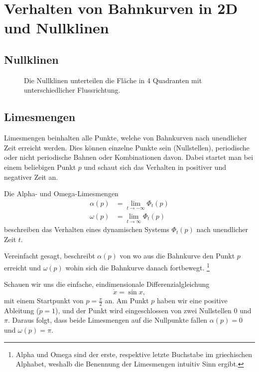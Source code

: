 \section{Verhalten von Bahnkurven in 2D und Nullklinen} \label{poinbendix:section:nullklinen}

\subsection{Nullklinen} \label{poinbendix:subsection:nullklinen}


\begin{figure}
    \centering
    
    \caption{Die Nullklinen unterteilen die Fläche in 4 Quadranten mit unterschiedlicher Flussrichtung.}
    \label{poinbendix:fig:nullklinen}
\end{figure}

\subsection{Limesmengen} \label{poinbendix:subsection:limesmengen}

Limesmengen beinhalten alle Punkte, welche von Bahnkurven nach unendlicher Zeit erreicht werden.
Dies können einzelne Punkte sein (Nullstellen), periodische oder nicht periodische Bahnen oder Kombinationen davon.
Dabei startet man bei einem beliebigen Punkt $p$ und schaut sich das Verhalten in positiver und negativer Zeit an.

\begin{definition}[Limesmengen]
Die Alpha- und Omega-Limesmengen
\label{poinbendix:def:limesmengen}
\begin{align*}
    \alpha(p) &= \lim_{t\to-\infty} \Phi_t(p) \\
    \omega(p) &= \lim_{t\to\infty} \Phi_t(p)
\end{align*}
beschreiben das Verhalten eines dynamischen Systems $\Phi_t(p)$ nach unendlicher Zeit $t$.
\end{definition}

Vereinfacht gesagt, beschreibt $\alpha(p)$ von wo aus die Bahnkurve den Punkt $p$ erreicht und $\omega(p)$ wohin sich die Bahnkurve danach fortbewegt.
\footnote{Alpha und Omega sind der erste, respektive letzte Buchstabe im griechischen Alphabet, weshalb die Benennung der Limesmengen intuitiv Sinn ergibt.}

\begin{beispiel} \label{poinbendix:beispiel:1dlimesmengen}
Schauen wir uns die einfache, eindimensionale Differenzialgleichung
\begin{equation*}
    \dot{x} = \sin x,
\end{equation*}
mit einem Startpunkt von $p = \frac{\pi}{2}$ an.
Am Punkt $p$ haben wir eine positive Ableitung ($\dot{p} = 1$), und der Punkt wird eingeschlossen von zwei Nullstellen $0$ und $\pi$.
Daraus folgt, dass beide Limesmengen auf die Nullpunkte fallen $\alpha(p) = 0$ und $\omega(p) = \pi$.
\end{beispiel}
